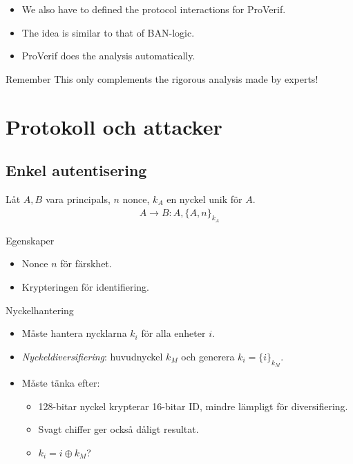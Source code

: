 \documentclass{beamer}
\theoremstyle{definition}
\theoremstyle{remark}
\DeclareMathOperator{\xor}{\oplus}
\newcommand{\encrypt}[2]{\{#1\}_{#2}}
\begin{document}
\begin{frame}
  \begin{itemize}
    \item We also have to defined the protocol interactions for ProVerif.
    \item The idea is similar to that of BAN-logic.
    \item ProVerif does the analysis automatically.
  \end{itemize}
  
  \pause{}

  \begin{alertblock}{Remember}
    This only complements the rigorous analysis made by experts!
  \end{alertblock}
\end{frame}


\section{Protokoll och attacker}

\subsection{Enkel autentisering}

\begin{frame}
  \begin{example}
    Låt \(A, B\) vara principals, \(n\) nonce, \(k_A\) en nyckel unik för 
    \(A\).
    \begin{align*}
      A\to B\colon A, \encrypt{A, n}{k_A}
    \end{align*}
  \end{example}
  \begin{block}{Egenskaper}
    \begin{itemize}
      \item Nonce \(n\) för färskhet.
      \item Krypteringen för identifiering.
    \end{itemize}
  \end{block}
\end{frame}

\begin{frame}{Nyckelhantering}
  \begin{itemize}
    \item Måste hantera nycklarna \(k_i\) för alla enheter \(i\).
    \item \emph{Nyckeldiversifiering}: huvudnyckel \(k_M\) och generera \(k_i 
      = \encrypt{i}{k_M}\).
    \item Måste tänka efter:
      \begin{itemize}
        \item 128-bitar nyckel krypterar 16-bitar ID, mindre lämpligt för 
          diversifiering.
        \item Svagt chiffer ger också dåligt resultat.
        \item \(k_i = i\xor k_M\)?
      \end{itemize}
  \end{itemize}
\end{frame}
\end{document}
